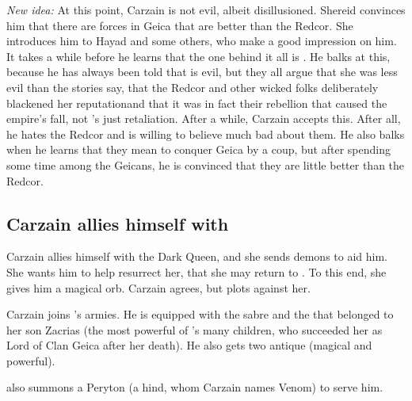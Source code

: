 \begin{garbage}
\emph{New idea:} 
At this point, Carzain is not evil, albeit disillusioned. 
Shereid convinces him that there are forces in Geica that are better than the Redcor. 
She introduces him to Hayad and some others, who make a good impression on him. 
It takes a while before he learns that the one behind it all is \Belzir. 
He balks at this, because he has always been told that \Belzir{} is evil, but they all argue that she was less evil than the stories say, that the Redcor and other wicked folks deliberately blackened her reputation\dash and that it was in fact their rebellion that caused the empire's fall, not \Belzir's just retaliation. 
After a while, Carzain accepts this. 
After all, he hates the Redcor and is willing to believe much bad about them. 
He also balks when he learns that they mean to conquer Geica by a coup, but after spending some time among the Geicans, he is convinced that they are little better than the Redcor. 







\subsection{Carzain allies himself with \Belzir} 
Carzain allies himself with the Dark Queen, and she sends demons to aid him. 
She wants him to help resurrect her, that she may return to \Miith{}. 
To this end, she gives him a magical orb. 
Carzain agrees, but plots against her. 

Carzain joins \Belzir's armies. 
He is equipped with the sabre and the  that belonged to her son Zacrias (the most powerful of \Belzir's many children, who succeeded her as Lord of Clan Geica after her death). 
He also gets two antique  (magical and powerful). 

\Belzir{} also summons a Peryton (a hind, whom Carzain names Venom) to serve him. 

















\end{garbage}
